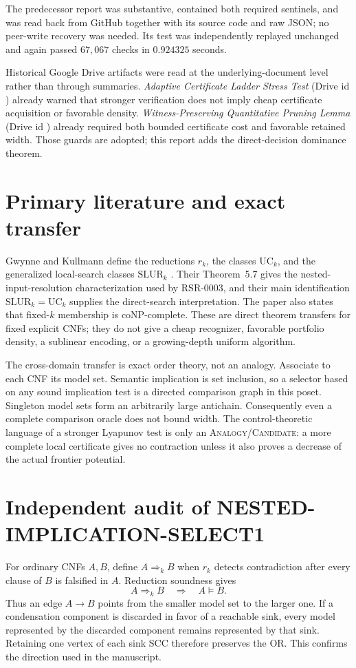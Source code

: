 \documentclass[11pt]{article}
\begin{document}
The predecessor report
was substantive, contained both required sentinels, and was read back from
GitHub together with its source code and raw JSON; no peer-write recovery was
needed.  Its test was independently replayed unchanged and again passed
$67{,}067$ checks in $0.924325$ seconds.

Historical Google Drive artifacts were read at the underlying-document
level rather than through summaries.  \emph{Adaptive Certificate Ladder
Stress Test} (Drive id
) already warned
that stronger verification does not imply cheap certificate acquisition or
favorable density.  \emph{Witness-Preserving Quantitative Pruning Lemma}
(Drive id
) already required
both bounded certificate cost and favorable retained width.  Those guards
are adopted; this report adds the direct-decision dominance theorem.

\section{Primary literature and exact transfer}
Gwynne and Kullmann define the reductions $r_k$, the classes
$\mathrm{UC}_k$, and the generalized local-search classes
$\mathrm{SLUR}_k$ \cite{gwynne2014nested}.  Their Theorem~5.7 gives the
nested-input-resolution characterization used by RSR-0003, and their main
identification $\mathrm{SLUR}_k=\mathrm{UC}_k$ supplies the direct-search
interpretation.  The paper also states that fixed-$k$ membership is
coNP-complete.  These are direct theorem transfers for fixed explicit CNFs;
they do not give a cheap recognizer, favorable portfolio density, a
sublinear encoding, or a growing-depth uniform algorithm.

The cross-domain transfer is exact order theory, not an analogy.  Associate
to each CNF its model set.  Semantic implication is set inclusion, so a
selector based on any sound implication test is a directed comparison graph
in this poset.  Singleton model sets form an arbitrarily large antichain.
Consequently even a complete comparison oracle does not bound width.  The
control-theoretic language of a stronger Lyapunov test is only an
\textsc{Analogy/Candidate}: a more complete local certificate gives no
contraction unless it also proves a decrease of the actual frontier
potential.

\section{Independent audit of NESTED-IMPLICATION-SELECT1}
For ordinary CNFs $A,B$, define $A\Rightarrow_kB$ when $r_k$ detects
contradiction after every clause of $B$ is falsified in $A$.  Reduction
soundness gives
\[
 A\Rightarrow_kB\quad\Longrightarrow\quad A\models B.
\]
Thus an edge $A\to B$ points from the smaller model set to the larger one.
If a condensation component is discarded in favor of a reachable sink,
every model represented by the discarded component remains represented by
that sink.  Retaining one vertex of each sink SCC therefore preserves the
OR.  This confirms the direction used in the manuscript.
\end{document}
